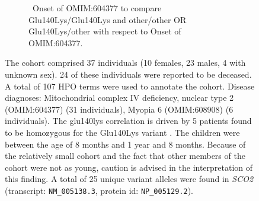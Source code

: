 \begin{figure}[htbp]
\vspace{2em}

\begin{subfigure}[b]{0.95\textwidth}
\captionsetup{justification=raggedright,singlelinecheck=false}
\caption{ Onset of OMIM:604377 to compare Glu140Lys/Glu140Lys and other/other OR Glu140Lys/other with respect to Onset of OMIM:604377. }
\end{subfigure}

\vspace{2em}

\caption{ The cohort comprised 37 individuals (10 females, 23 males, 4 with unknown sex). 24 of these individuals were reported to be deceased. 
A total of 107 HPO terms were used to annotate the cohort. Disease diagnoses: Mitochondrial complex IV deficiency, nuclear type 2 (OMIM:604377) (31 individuals), 
Myopia 6 (OMIM:608908) (6 individuals). The glu140lys correlation is driven by 5 patients found to be homozygous for the Glu140Lys variant \cite{PMID_15499950}. 
The children were between the age of 8 months and 1 year and 8 months. Because of the relatively small cohort and the fact that other members of the cohort were not as young, caution is advised in the interpretation of this finding.  A total of 25 unique variant alleles were found in \textit{SCO2} (transcript: \texttt{NM\_005138.3}, protein id: \texttt{NP\_005129.2}).}
\end{figure}
